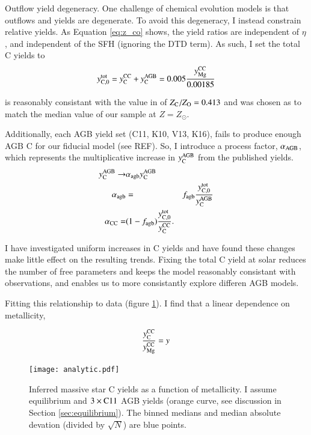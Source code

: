\documentclass[12pt,oneside]{report}
\newcommand{\Ycc}{\ensuremath{y_{\rm C}^{\rm CC}}}
\newcommand{\Yct}{\ensuremath{y_{\rm C, 0}^{\rm tot}}}
\newcommand{\Yoc}{\ensuremath{y_{\rm Mg}^{\rm CC}}}
\newcommand{\Ycagb}{\ensuremath{y_{\rm C}^{\rm AGB}}}
\newcommand{\sun}{\ensuremath{\odot}}
\begin{document}
Outflow yield degeneracy.
One challenge of chemical evolution models is that outflows and yields are degenerate. To avoid this degeneracy, I instead constrain relative yields. As Equation \ref{eq:z_co} shows, the yield ratios are independent of $\eta$, and independent of the SFH (ignoring the DTD term).
As such, I set the total C yields to 
\begin{equation}
    \Yct = \Ycc + \Ycagb = 0.005 \frac{\Yoc}{0.00185}
\end{equation}

is reasonably consistant with the value in \citet{asplund+09} of $Z_{\rm
C}/Z_{\rm O}=0.413$ and was chosen as to match the median value of our sample
at $Z=Z_{\sun }$. 

Additionally, each AGB yield set (C11, K10, V13, K16), fails to produce enough AGB C for our fiducial model (see REF). So, I introduce a process factor, $\alpha_{\rm AGB}$, which represents the multiplicative increase in $\Ycagb$ from the published yields.
\begin{subequations}
    \begin{align}
        \Ycagb \rightarrow &\alpha_{\rm agb}  \Ycagb \\
        \alpha_{\rm agb} &= &f_{\rm agb} \frac{\Yct}{\Ycagb} \\
        \alpha_{\rm CC} = &(1 - f_{\rm agb}) \frac{\Yct}{\Ycc}.
    \end{align}
\end{subequations}

I have investigated uniform increases in C yields and have found these changes make little effect on the resulting trends. Fixing the total C yield at solar reduces the number of free parameters and keeps the model reasonably consistant with observations, and enables us to more consistantly explore differen AGB models. 

Fitting this relationship to data (figure \ref{fig:analytic}).
I find that a linear dependence on metallicity,


\begin{equation}
    \frac{\Ycc}{\Yoc} = y_{\rm}
\end{equation}

\begin{figure}
    \centering
    \texttt{[image: analytic.pdf]}
    \caption[Reverse fit yields]{Inferred massive star C yields as a function of metallicity. I assume equilibrium and $3\times {\rm C11}$ AGB yields (orange curve, see discussion in Section \ref{sec:equilibrium}). The binned medians and median absolute devation (divided by $\sqrt{N}$) are blue points.
    }
    \label{fig:analytic}
\end{figure}
\end{document}
